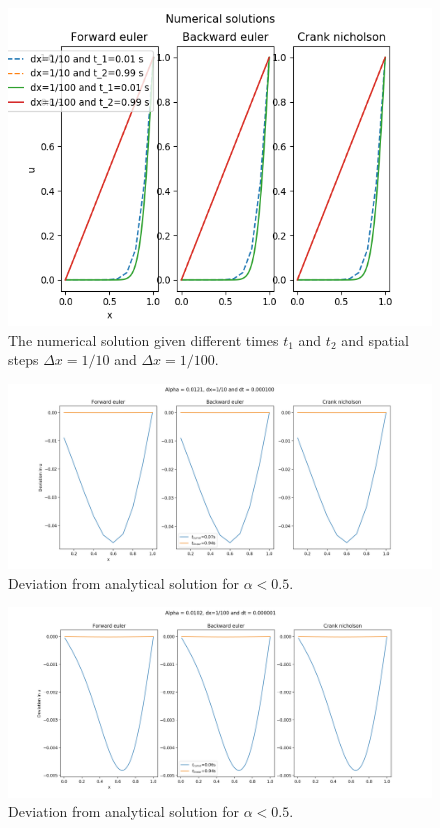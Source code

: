 \documentclass{article}
\begin{document}
\begin{figure}[H]
	\centering
	\includegraphics[width=140mm]{c.png}
	\caption{The numerical solution given different times $t_1$ and $t_2$ and spatial steps $\Delta x =1/10$ and $\Delta x = 1/100$.}
	\label{fig:c}
\end{figure}

\begin{figure}[H]
	\centering
	\includegraphics[width=180mm]{1_10}
	\caption{Deviation from analytical solution for $\alpha<0.5$.}
	\label{fig:1_10}
\end{figure}

\begin{figure}[H]
	\centering
	\includegraphics[width=180mm]{1_100}
	\caption{Deviation from analytical solution for $\alpha<0.5$.}
	\label{fig:1_100}
\end{figure}
\end{document}
